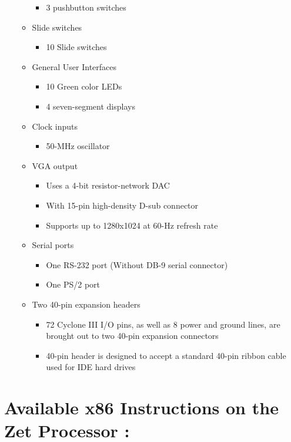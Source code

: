 \documentclass[11pt,peerreviewca]{IEEEtran}
\begin{document}
\begin{itemize}
\begin{itemize}
		\begin{itemize}
		\item 3 pushbutton switches
		\end{itemize}
	\item Slide switches
		\begin{itemize}
		\item 10 Slide switches
		\end{itemize}
	\item General User Interfaces
		\begin{itemize}
		\item 10 Green color LEDs
		\item 4 seven-segment displays
		\end{itemize}
	\item Clock inputs
		\begin{itemize}
		\item 50-MHz oscillator
		\end{itemize}
	\item VGA output
		\begin{itemize}
		\item Uses a 4-bit resistor-network DAC
		\item With 15-pin high-density D-sub connector
		\item Supports up to 1280x1024 at 60-Hz refresh rate
		\end{itemize}
	\item Serial ports
		\begin{itemize}
		\item One RS-232 port (Without DB-9 serial connector)
		\item One PS/2 port
		\end{itemize}
	\item Two 40-pin expansion headers
		\begin{itemize}
		\item 72 Cyclone III I/O pins, as well as 8 power and ground lines, are brought out to two 40-pin expansion connectors
		\item40-pin header is designed to accept a standard 40-pin ribbon cable used for IDE hard drives 
		\end{itemize}
	\end{itemize}
\end{itemize}

\label{App:AppendixB}
\section{Available x86 Instructions on the Zet Processor \cite{ZetStatus}:}
\end{document}
